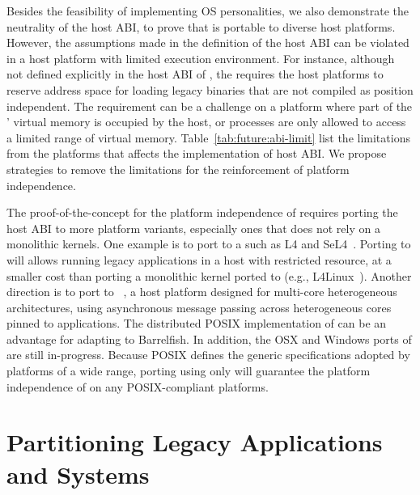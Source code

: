 Besides the feasibility of implementing OS personalities,
we also demonstrate the neutrality of the host ABI,
to prove that \graphene{} is portable to diverse host platforms.
However, the assumptions made in the definition of the host ABI
can be violated in a host platform with limited execution environment.
For instance, although not defined explicitly in the host ABI of \graphene{},
the \picoprocs{} requires the host platforms
to reserve address space for loading legacy binaries that are not compiled as position independent.
The requirement can be a challenge on a platform
where part of the \picoprocs{}' virtual memory is occupied by the host,
or processes are only allowed to access a limited range of virtual memory.
Table~\ref{tab:future:abi-limit}
list the limitations from the platforms that affects the implementation of host ABI.
We propose strategies to remove the limitations for the reinforcement of platform independence.


The proof-of-the-concept for the platform independence of \graphene{}
requires porting the host ABI to more platform variants,
especially ones that does not rely on a monolithic kernels.
One example is to port \graphene{} to a \term{\microkernel{}}
such as L4 and SeL4~\citep{l4family, klein09sel4}.
Porting \picoprocs{} to \microkernel{} will allows running legacy applications
in a host with restricted resource,
at a smaller cost than porting a monolithic kernel ported to \microkernel{}
(e.g., L4Linux~\citep{hartig97mu}).
Another direction is to port \graphene{} to ~\citep{baumann09barrelfish},
a host platform designed for multi-core heterogeneous architectures,
using asynchronous message passing across heterogeneous cores pinned to applications.
The distributed POSIX implementation of \graphene{}
can be an advantage for adapting to Barrelfish.
In addition, the OSX and Windows ports of \graphene{} are still in-progress.
Because POSIX defines the generic specifications
adopted by platforms of a wide range,
porting \graphene{}
using only  will
guarantee the platform independence of \graphene{}
on any POSIX-compliant platforms.




\section{Partitioning Legacy Applications and Systems}



